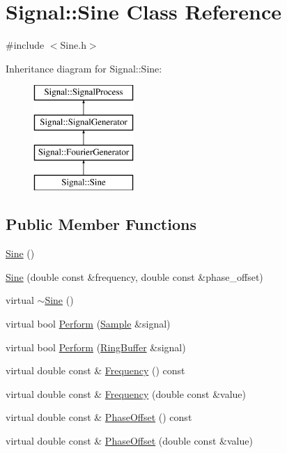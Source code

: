 \hypertarget{classSignal_1_1Sine}{\section{Signal\+:\+:Sine Class Reference}
\label{classSignal_1_1Sine}
}


{\ttfamily \#include $<$Sine.\+h$>$}

Inheritance diagram for Signal\+:\+:Sine\+:\begin{figure}[H]
\begin{center}
\leavevmode
\includegraphics[height=4.000000cm]{classSignal_1_1Sine}
\end{center}
\end{figure}
\subsection*{Public Member Functions}
\begin{DoxyCompactItemize}
\item 
\hyperlink{classSignal_1_1Sine_aa808d1e080ee1c18324eedc020ee0514}{Sine} ()
\item 
\hyperlink{classSignal_1_1Sine_a0dbdf5da8c6baeea56a70f3eb9c3a6fd}{Sine} (double const \&frequency, double const \&phase\+\_\+offset)
\item 
virtual \hyperlink{classSignal_1_1Sine_a0d6a85ad0ddea987aba1955f98be89df}{$\sim$\+Sine} ()
\item 
virtual bool \hyperlink{classSignal_1_1Sine_a8f7c74c35cfd87b490d84a7a75c35691}{Perform} (\hyperlink{classSignal_1_1Sample}{Sample} \&signal)
\item 
virtual bool \hyperlink{classSignal_1_1Sine_ac0a6c6e24f830446ea75de3a392f7e06}{Perform} (\hyperlink{classSignal_1_1RingBuffer}{Ring\+Buffer} \&signal)
\item 
virtual double const \& \hyperlink{classSignal_1_1SignalGenerator_a96af42ee68f94e9b04d034fd68b73ecd}{Frequency} () const 
\item 
virtual double const \& \hyperlink{classSignal_1_1SignalGenerator_af83b532bf3ddc3637c2fd7a1dfd095cb}{Frequency} (double const \&value)
\item 
virtual double const \& \hyperlink{classSignal_1_1SignalGenerator_ac2538ec946f001e394d2416fda698d1c}{Phase\+Offset} () const 
\item 
virtual double const \& \hyperlink{classSignal_1_1SignalGenerator_ac6a103ff72beaa338f6d18c812522d78}{Phase\+Offset} (double const \&value)
\end{DoxyCompactItemize}

